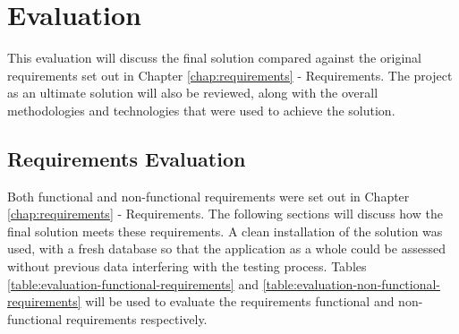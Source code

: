 \chapter{Evaluation}
\label{chap:evaluation}
This evaluation will discuss the final solution compared against the original requirements set out in Chapter \ref{chap:requirements} - Requirements. The project as an ultimate solution will also be reviewed, along with the overall methodologies and technologies that were used to achieve the solution.

\section{Requirements Evaluation}
\label{sec:requirements-evaluation}
Both functional and non-functional requirements were set out in Chapter \ref{chap:requirements} - Requirements. The following sections will discuss how the final solution meets these requirements. A clean installation of the solution was used, with a fresh database so that the application as a whole could be assessed without previous data interfering with the testing process. Tables \ref{table:evaluation-functional-requirements} and \ref{table:evaluation-non-functional-requirements} will be used to evaluate the requirements functional and non-functional requirements respectively.

